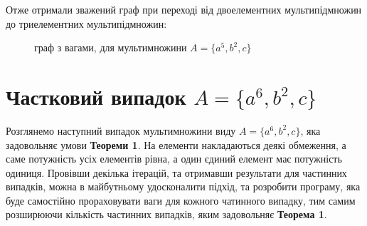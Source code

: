 Отже отримали зважений граф при переході від двоелементних мультипідмножин до триелементних мультипідмножин:
\begin{figure}
\begin{center}
\end{center}
\caption{граф з вагами, для мультимножини  $ A = \{a^5, b^2, c\} $}
\end{figure}

\section{Частковий випадок $A = \{a^6, b^2, c\}$}

Розглянемо наступний випадок мультимножини виду $A = \{a^6, b^2, c\}$, яка задовольняє умови {\bf Теореми 1}. На елементи накладаються деякі обмеження, а саме потужність усіх елементів рівна, а один єдиний елемент має потужність одиниця. Провівши декілька ітерацій, та отримавши результати для частинних випадків, можна в майбутньому удосконалити підхід, та розробити програму, яка буде самостійно прораховувати ваги для кожного чатинного випадку, тим самим розширюючи кількість частинних випадків, яким задовольняє  {\bf Теорема 1}.

